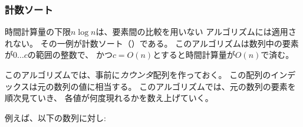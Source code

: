 \begin{comment}
\subsubsection{Counting sort}

\index{counting sort}

The lower bound $n \log n$ does not apply to
algorithms that do not compare array elements
but use some other information.
An example of such an algorithm is
\key{counting sort} that sorts an array in
$O(n)$ time assuming that every element in the array
is an integer between $0 \ldots c$ and $c=O(n)$.

The algorithm creates a \emph{bookkeeping} array,
whose indices are elements of the original array.
The algorithm iterates through the original array
and calculates how many times each element
appears in the array.
\newpage

For example, the array
\end{comment}

\subsubsection{計数ソート}


時間計算量の下限$n \log n$は、要素間の比較を用いない
アルゴリズムには適用されない。
その一例が計数ソート（）である。
このアルゴリズムは数列中の要素が$0 \ldots c$の範囲の整数で、
かつ$c=O(n)$とすると時間計算量が$O(n)$で済む。

このアルゴリズムでは、事前に\emph{カウンタ}配列を作っておく。
この配列のインデックスは元の数列の値に相当する。
このアルゴリズムでは、元の数列の要素を順次見ていき、
各値が何度現れるかを数え上げていく。
\newpage

例えば、以下の数列に対し:
\begin{center}
\end{center}

\begin{comment}
corresponds to the following bookkeeping array:
\end{comment}

